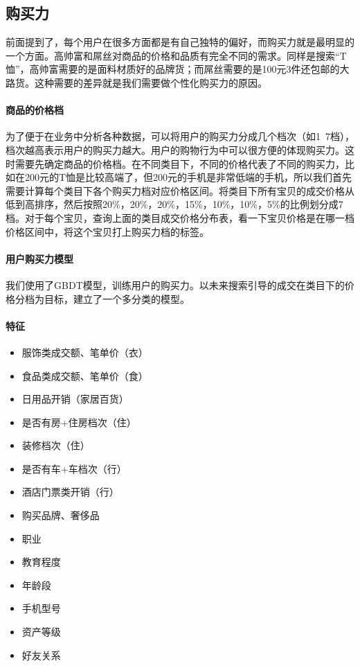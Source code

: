 	\subsection{购买力}
	
	前面提到了，每个用户在很多方面都是有自己独特的偏好，而购买力就是最明显的一个方面。高帅富和屌丝对商品的价格和品质有完全不同的需求。同样是搜索“T恤”，高帅富需要的是面料材质好的品牌货；而屌丝需要的是100元3件还包邮的大路货。这种需要的差异就是我们需要做个性化购买力的原因。
	
	\paragraph{商品的价格档}
	
	为了便于在业务中分析各种数据，可以将用户的购买力分成几个档次（如1~7档），档次越高表示用户的购买力越大。用户的购物行为中可以很方便的体现购买力。这时需要先确定商品的价格档。在不同类目下，不同的价格代表了不同的购买力，比如在200元的T恤是比较高端了，但200元的手机是非常低端的手机，所以我们首先需要计算每个类目下各个购买力档对应价格区间。将类目下所有宝贝的成交价格从低到高排序，然后按照20\%，20\%，20\%，15\%，10\%，10\%，5\%的比例划分成7档。对于每个宝贝，查询上面的类目成交价格分布表，看一下宝贝价格是在哪一档价格区间中，将这个宝贝打上购买力档的标签。
	
	\paragraph{用户购买力模型}
	
	我们使用了GBDT模型，训练用户的购买力。以未来搜索引导的成交在类目下的价格分档为目标，建立了一个多分类的模型。
	
	\paragraph{特征}
	
	\begin{itemize}
		\item{服饰类成交额、笔单价（衣）}
		\item{食品类成交额、笔单价（食）}
		\item{日用品开销（家居百货）}
		\item{是否有房+住房档次（住）}
		\item{装修档次（住）}
		\item{是否有车+车档次（行）}
		\item{酒店门票类开销（行）}
		\item{购买品牌、奢侈品}
		\item{职业}
		\item{教育程度}
		\item{年龄段}
		\item{手机型号}
		\item{资产等级}
		\item{好友关系}
	\end{itemize}

